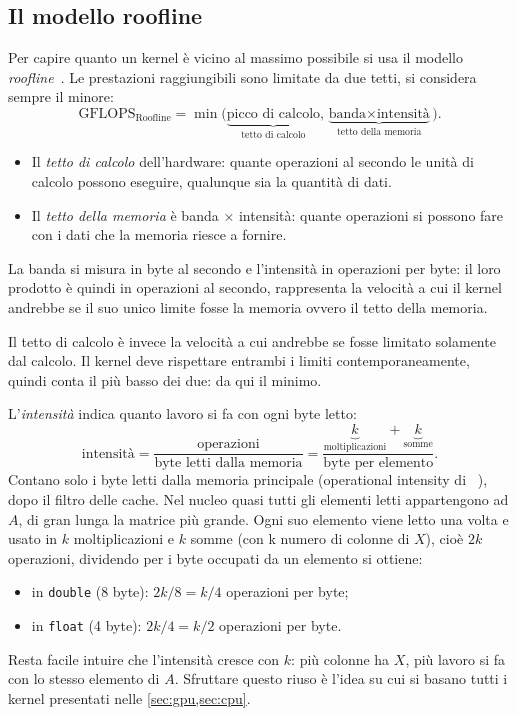 \documentclass[11pt,a4paper]{article}
\begin{document}
\subsection{Il modello roofline}\label{sec:roofline}

Per capire quanto un kernel è vicino al
massimo possibile si usa il modello \emph{roofline}~\cite{williams2009}. Le
prestazioni raggiungibili sono limitate da due tetti, si considera sempre il minore:
\[
  \text{GFLOPS}_{\text{Roofline}} = \min\bigl(\underbrace{\text{picco di calcolo}}_\text{tetto di calcolo},\underbrace{\text{banda} \times \text{intensità}}_{\text{tetto della memoria}}\bigr).
\]
\begin{itemize}
  \item Il \emph{tetto di calcolo} dell'hardware: quante
        operazioni al secondo le unità di calcolo possono eseguire, qualunque
        sia la quantità di dati.
  \item Il \emph{tetto della memoria} è banda $\times$ intensità: quante
        operazioni si possono fare con i dati che la memoria riesce a fornire.
\end{itemize}
La banda si misura in byte al secondo e l'intensità in operazioni per byte: il
loro prodotto è quindi in operazioni al secondo, rappresenta la velocità a cui il
kernel andrebbe se il suo unico limite fosse la memoria ovvero il tetto della memoria.

Il tetto di calcolo è invece la
velocità a cui andrebbe se fosse limitato solamente dal calcolo. Il kernel deve
rispettare entrambi i limiti contemporaneamente, quindi conta il più basso dei
due: da qui il minimo.

L'\emph{intensità} indica quanto lavoro
si fa con ogni byte letto:
\[
  \text{intensità}
  = \frac{\text{operazioni}}{\text{byte letti dalla memoria}}
  = \frac{\underbrace{k}_{\text{moltiplicazioni}} + \underbrace{k}_{\text{somme}}}
         {\text{byte per elemento}} .
\]
Contano solo i byte letti dalla memoria principale (operational intensity di ~\cite{williams2009}), dopo il filtro delle cache.
Nel nucleo quasi tutti gli elementi letti appartengono ad $A$, di gran lunga la
matrice più grande. Ogni suo elemento viene letto una volta e usato in $k$
moltiplicazioni e $k$ somme (con k numero di colonne di $X$), cioè $2k$ operazioni, dividendo per i byte
occupati da un elemento si ottiene:
\begin{itemize}
  \item in \texttt{double} (8 byte): $2k/8 = k/4$ operazioni per byte;
  \item in \texttt{float} (4 byte): $2k/4 = k/2$ operazioni per byte.
\end{itemize}
Resta facile intuire che l'intensità cresce con $k$: più colonne ha $X$, più lavoro si fa con lo stesso
elemento di $A$.
Sfruttare questo riuso è l'idea su cui si basano tutti i kernel presentati
nelle \cref{sec:gpu,sec:cpu}.
\end{document}
